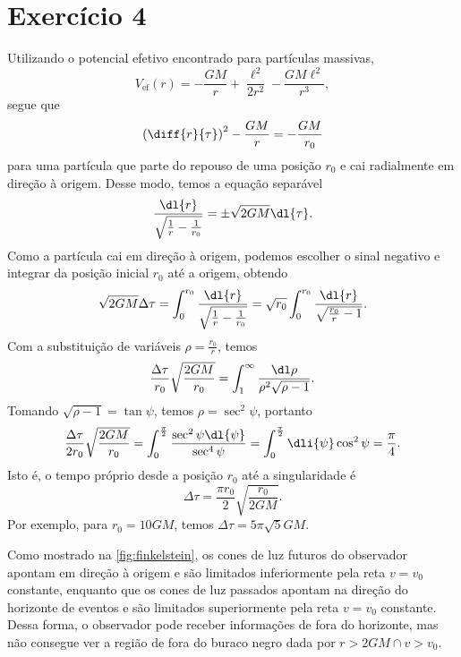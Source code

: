 \section*{Exercício 4}
Utilizando o potencial efetivo encontrado para partículas massivas,
\begin{equation*}
    V_\mathrm{ef}(r) = - \frac{GM}{r} + \frac{\ell^2}{2r^2} - \frac{GM\ell^2}{r^3},
\end{equation*}
segue que
\begin{equation*}
    \left(\diff{r}{\tau}\right)^2 - \frac{GM}{r} = - \frac{GM}{r_0}
\end{equation*}
para uma partícula que parte do repouso de uma posição \(r_0\) e cai radialmente em direção à origem. Desse modo, temos a equação separável
\begin{equation*}
    \frac{\dl{r}}{\sqrt{\frac1r - \frac1{r_0}}} = \pm\sqrt{2GM} \dl{\tau}.
\end{equation*}
Como a partícula cai em direção à origem, podemos escolher o sinal negativo e integrar da posição inicial \(r_0\) até a origem, obtendo
\begin{equation*}
    \sqrt{2GM} \Delta\tau = \int_{0}^{r_0} \frac{\dl{r}}{\sqrt{\frac1r - \frac1{r_0}}} = \sqrt{r_0} \int_{0}^{r_0} \frac{\dl{r}}{\sqrt{\frac{r_0}{r} - 1}}.
\end{equation*}
Com a substituição de variáveis \(\rho = \frac{r_0}{r}\), temos
\begin{equation*}
    \frac{\Delta\tau}{r_0}\sqrt{\frac{2GM}{r_0}} = \int_1^\infty\frac{\dl\rho}{\rho^2\sqrt{\rho - 1}}.
\end{equation*}
Tomando \(\sqrt{\rho - 1} = \tan\psi\), temos \(\rho = \sec^2\psi\), portanto
\begin{equation*}
    \frac{\Delta\tau}{2r_0}\sqrt{\frac{2GM}{r_0}} = \int_{0}^\frac\pi2 \frac{\sec^2\psi\dl{\psi}}{\sec^4\psi} = \int_{0}^{\frac\pi2} \dli{\psi}\cos^2\psi = \frac{\pi}{4}.
\end{equation*}
Isto é, o tempo próprio desde a posição \(r_0\) até a singularidade é
\begin{equation*}
    \Delta \tau = \frac{\pi r_0}{2}\sqrt{\frac{r_0}{2GM}}.
\end{equation*}
Por exemplo, para \(r_0 = 10GM\), temos \(\Delta\tau = 5\pi\sqrt{5}GM\).

Como mostrado na \cref{fig:finkelstein}, os cones de luz futuros do observador apontam em direção à origem e são limitados inferiormente pela reta \(v = v_0\) constante, enquanto que os cones de luz passados apontam na direção do horizonte de eventos e são limitados superiormente pela reta \(v = v_0\) constante. Dessa forma, o observador pode receber informações de fora do horizonte, mas não consegue ver a região de fora do buraco negro dada por \(r > 2GM \cap v > v_0\).

